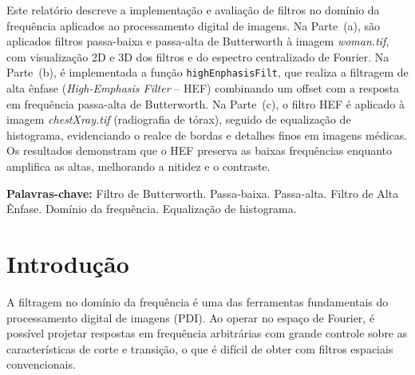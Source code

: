 \documentclass[12pt,a4paper,oneside,brazil,chapter=TITLE,section=TITLE]{abntex2}
\begin{document}
\begin{resumo}
Este relat\'orio descreve a implementa\c{c}\~ao e avalia\c{c}\~ao de
filtros no dom\'inio da frequ\^encia aplicados ao processamento digital
de imagens. Na Parte~(a), s\~ao aplicados filtros passa-baixa e
passa-alta de Butterworth \`a imagem \textit{woman.tif}, com visualiza\c{c}\~ao
2D e 3D dos filtros e do espectro centralizado de Fourier.
Na Parte~(b), \'e implementada a fun\c{c}\~ao
\texttt{highEnphasisFilt}, que realiza a filtragem de alta \^enfase
(\textit{High-Emphasis Filter} -- HEF) combinando um offset com a
resposta em frequ\^encia passa-alta de Butterworth.
Na Parte~(c), o filtro HEF \'e aplicado \`a imagem \textit{chestXray.tif}
(radiografia de t\'orax), seguido de equaliza\c{c}\~ao de histograma,
evidenciando o realce de bordas e detalhes finos em imagens m\'edicas.
Os resultados demonstram que o HEF preserva as baixas frequ\^encias
enquanto amplifica as altas, melhorando a nitidez e o contraste.

\vspace{0.5cm}
\noindent\textbf{Palavras-chave:}
Filtro de Butterworth.
Passa-baixa.
Passa-alta.
Filtro de Alta \^Enfase.
Dom\'inio da frequ\^encia.
Equaliza\c{c}\~ao de histograma.
\end{resumo}

\tableofcontents*
\cleardoublepage

\textual

\chapter{Introdu\c{c}\~ao}

A filtragem no dom\'inio da frequ\^encia \'e uma das ferramentas
fundamentais do processamento digital de imagens (PDI).
Ao operar no espa\c{c}o de Fourier, \'e poss\'ivel projetar respostas
em frequ\^encia arbitr\'arias com grande controle sobre as
caracter\'isticas de corte e transi\c{c}\~ao, o que \'e dif\'icil
de obter com filtros espaciais convencionais.
\end{document}
